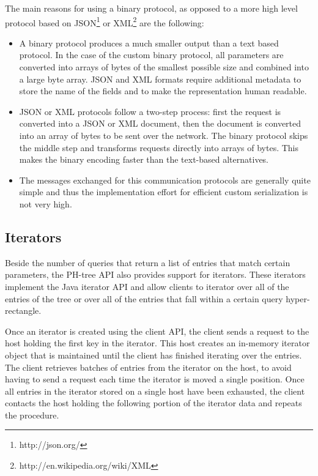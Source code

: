 \documentclass[11pt,a4paper]{globis-book}
\begin{document}
The main reasons for using a binary protocol, as opposed to a more high level protocol based on JSON\footnote{http://json.org/} or XML\footnote{http://en.wikipedia.org/wiki/XML} are the following:
\begin{itemize}
    \item A binary protocol produces a much smaller output than a text based protocol. In the case of the custom binary protocol, all parameters are converted into arrays of bytes of the smallest possible size and combined into a large byte array. JSON and XML formats require additional metadata to store the name of the fields and to make the representation human readable. 
    \item JSON or XML protocols follow a two-step process: first the request is converted into a JSON or XML document, then the document is converted into an array of bytes to be sent over the network. The binary protocol skips the middle step and transforms requests directly into arrays of bytes. This makes the binary encoding faster than the text-based alternatives.
    \item The messages exchanged for this communication protocols are generally quite simple and thus the implementation effort for efficient custom serialization is not very high. 
\end{itemize}

\subsection{Iterators}

Beside the number of queries that return a list of entries that match certain parameters, the PH-tree API also provides support for iterators. These iterators implement the Java iterator API and allow clients to iterator over all of the entries of the tree or over all of the entries that fall within a certain query hyper-rectangle.

Once an iterator is created using the client API, the client sends a request to the host holding the first key in the iterator. This host creates an in-memory iterator object that is maintained until the client has finished iterating over the entries. The client retrieves batches of entries from the iterator on the host, to avoid having to send a request each time the iterator is moved a single position. Once all entries in the iterator stored on a single host have been exhausted, the client contacts the host holding the following portion of the iterator data and repeats the procedure. 
\end{document}
